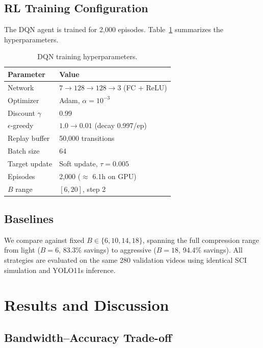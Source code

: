 \documentclass[10pt,journal]{IEEEtran}
\begin{document}
\subsection{RL Training Configuration}

The DQN agent is trained for 2,000 episodes. Table~\ref{tab:hyperparams} summarizes the hyperparameters.

\begin{table}[!htb]
\caption{DQN training hyperparameters.}
\label{tab:hyperparams}
\centering
\begin{tabular}{ll}
\toprule
\textbf{Parameter} & \textbf{Value} \\
\midrule
Network & $7 \to 128 \to 128 \to 3$ (FC + ReLU) \\
Optimizer & Adam, $\alpha = 10^{-3}$ \\
Discount $\gamma$ & 0.99 \\
$\epsilon$-greedy & $1.0 \to 0.01$ (decay 0.997/ep) \\
Replay buffer & 50,000 transitions \\
Batch size & 64 \\
Target update & Soft update, $\tau = 0.005$ \\
Episodes & 2,000 ($\approx$ 6.1h on GPU) \\
$B$ range & $[6, 20]$, step 2 \\
\bottomrule
\end{tabular}
\end{table}

\subsection{Baselines}

We compare against fixed $B \in \{6, 10, 14, 18\}$, spanning the full compression range from light ($B{=}6$, 83.3\% savings) to aggressive ($B{=}18$, 94.4\% savings). All strategies are evaluated on the same 280 validation videos using identical SCI simulation and YOLO11s inference.

\FloatBarrier

\section{Results and Discussion}

\subsection{Bandwidth--Accuracy Trade-off}
\end{document}

